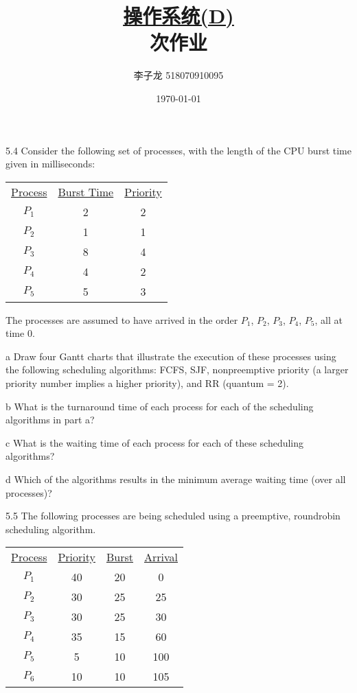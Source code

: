 \documentclass[12pt,a4paper]{article}
\newenvironment{problems}{\begin{list}{}{\renewcommand{\makelabel}[1]{\textbf{##1}\hfil}}}{\end{list}}
\newenvironment{steps}{\begin{list}{}{\renewcommand{\makelabel}[1]{##1.\hfil}}}{\end{list}}
\begin{document}
\title{\normalsize \underline{操作系统(D)}\\ 次作业}
\author{李子龙 518070910095}
\date{\today}
\maketitle

\begin{problems}
    \item[5.4] Consider the following set of processes, with the length of the CPU burst
    time given in milliseconds:

    \begin{tabular}{ccc}
        \underline{Process} & \underline{Burst Time} & \underline{Priority} \\
        $P_1$ & 2 & 2 \\
        $P_2$ & 1 & 1 \\
        $P_3$ & 8 & 4 \\
        $P_4$ & 4 & 2 \\
        $P_5$ & 5 & 3
    \end{tabular}

    The processes are assumed to have arrived in the order $P_1$, $P_2$, $P_3$, $P_4$, $P_5$,
    all at time 0.

    \begin{steps}
        \item[a] Draw four Gantt charts that illustrate the execution of these processes
        using the following scheduling algorithms: FCFS, SJF, nonpreemptive
        priority (a larger priority number implies a higher
        priority), and RR (quantum = 2).
        \item[b] What is the turnaround time of each process for each of the
        scheduling algorithms in part a?
        \item[c] What is the waiting time of each process for each of these scheduling
        algorithms?
        \item[d] Which of the algorithms results in the minimum average waiting
        time (over all processes)?
    \end{steps}

    \item[5.5] The following processes are being scheduled using a preemptive, roundrobin
    scheduling algorithm.

    \begin{tabular}{cccc}
        \underline{Process} & \underline{Priority} & \underline{Burst} & \underline{Arrival} \\
        $P_1$ & 40& 20& 0\\
        $P_2$ & 30& 25& 25\\
        $P_3$ & 30& 25& 30
\\        $P_4$ & 35& 15& 60
\\        $P_5$ & 5 &10 &100
\\        $P_6$ & 10& 10& 105
    \end{tabular}


\end{problems}
\end{document}

